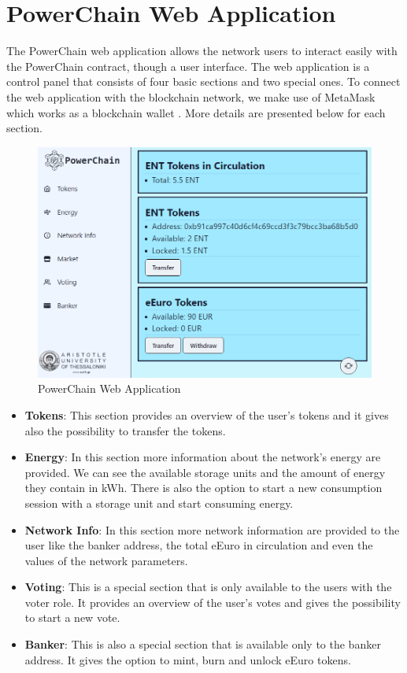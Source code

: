 \section{PowerChain Web Application}
The PowerChain web application allows the network users to interact easily with the PowerChain contract, though a user interface.
The web application is a control panel that consists of four basic sections and two special ones. To connect the web application with the blockchain network, we make use of MetaMask which works as a blockchain wallet \cite{metamask}.
More details are presented below for each section.
\begin{figure}[h!]
    \centering
    \includegraphics[width=\linewidth,frame,scale=1]{Figures/webapp.png}
    \caption{PowerChain Web Application}
\end{figure}
\begin{itemize}
    \item \textbf{Tokens}: This section provides an overview of the user's tokens and it gives also the possibility to transfer the tokens.
    \item \textbf{Energy}: In this section more information about the network's energy are provided. We can see the available storage units and the amount of energy they contain in kWh.
    There is also the option to start a new consumption session with a storage unit and start consuming energy.
    \item \textbf{Network Info}: In this section more network information are provided to the user like the banker address, the total eEuro in circulation and even the values of the network parameters.
    \item \textbf{Voting}: This is a special section that is only available to the users with the voter role. It provides an overview of the user's votes and gives the possibility to start a new vote.
    \item \textbf{Banker}: This is also a special section that is available only to the banker address. It gives the option to mint, burn and unlock eEuro tokens.
\end{itemize}
